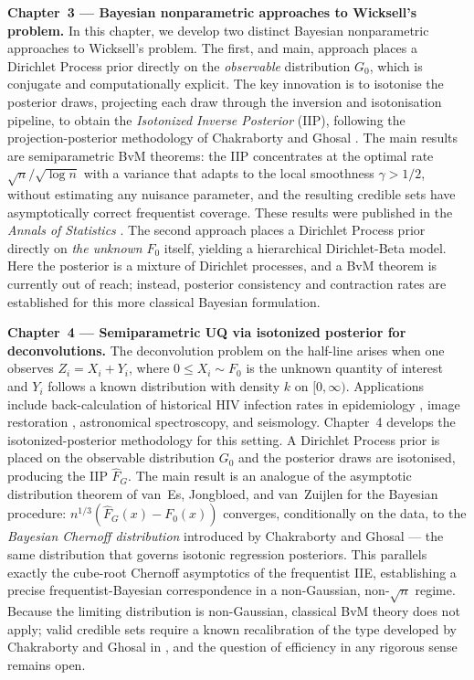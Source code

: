 \medskip
\noindent\textbf{Chapter~3 --- Bayesian nonparametric approaches to Wicksell's problem.}
In this chapter, we develop two distinct Bayesian nonparametric approaches to Wicksell's problem. The first, and main, approach places a Dirichlet Process prior directly on the \textit{observable} distribution $G_0$, which is conjugate and computationally explicit. The key innovation is to isotonise the posterior draws, projecting each draw through the inversion and isotonisation pipeline, to obtain the \textit{Isotonized Inverse Posterior} (IIP), following the projection-posterior methodology of Chakraborty and Ghosal \cite{60,54}. The main results are semiparametric BvM theorems: the IIP concentrates at the optimal rate $\sqrt{n}/\sqrt{\log n}$ with a variance that adapts to the local smoothness $\gamma > 1/2$, without estimating any nuisance parameter, and the resulting credible sets have asymptotically correct frequentist coverage. These results were published in the \textit{Annals of Statistics} \cite{51}. The second approach places a Dirichlet Process prior directly on \textit{the unknown} $F_0$ itself, yielding a hierarchical Dirichlet-Beta model. Here the posterior is a mixture of Dirichlet processes, and a BvM theorem is currently out of reach; instead, posterior consistency and contraction rates are established for this more classical Bayesian formulation.

\medskip
\noindent\textbf{Chapter~4 --- Semiparametric UQ via isotonized posterior for deconvolutions.}
The deconvolution problem on the half-line arises when one observes $Z_i = X_i + Y_i$, where $0 \le X_i \sim F_0$ is the unknown quantity of interest and $Y_i$ follows a known distribution with density $k$ on $[0,\infty)$. Applications include back-calculation of historical HIV infection rates in epidemiology \cite{61}, image restoration \cite{68,67}, astronomical spectroscopy, and seismology. Chapter~4 develops the isotonized-posterior methodology for this setting. A Dirichlet Process prior is placed on the observable distribution $G_0$ and the posterior draws are isotonised, producing the IIP $\hat{F}_{\scriptscriptstyle{G}}$. The main result is an analogue of the asymptotic distribution theorem of van~Es, Jongbloed, and van~Zuijlen \cite{74} for the Bayesian procedure: $n^{1/3}(\hat{F}_{\scriptscriptstyle{G}}(x) - F_0(x))$ converges, conditionally on the data, to the \textit{Bayesian Chernoff distribution} introduced by Chakraborty and Ghosal \cite{54} --- the same distribution that governs isotonic regression posteriors. This parallels exactly the cube-root Chernoff asymptotics of the frequentist IIE, establishing a precise frequentist-Bayesian correspondence in a non-Gaussian, non-$\sqrt{n}$ regime. Because the limiting distribution is non-Gaussian, classical BvM theory does not apply; valid credible sets require a known recalibration of the type developed by Chakraborty and Ghosal in \cite{54}, and the question of efficiency in any rigorous sense remains open.

